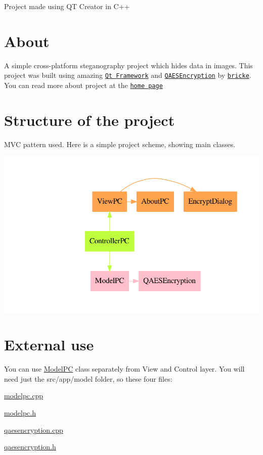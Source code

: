 Project made using QT Creator in C++\hypertarget{index_about}{}\section{About}\label{index_about}
A simple cross-\/platform steganography project which hides data in images. This project was built using amazing \href{https://qt.io}{\tt Qt Framework} and \href{https://github.com/bricke/Qt-AES}{\tt Q\+A\+E\+S\+Encryption} by \href{https://github.com/bricke}{\tt bricke}. You can read more about project at the \href{waleko.github.io/PictureCrypt}{\tt home page}\hypertarget{index_structure}{}\section{Structure of the project}\label{index_structure}
M\+VC pattern used. Here is a simple project scheme, showing main classes. 
\begin{DoxyImageNoCaption}
  \mbox{\includegraphics[width=\textwidth,height=\textheight/2,keepaspectratio=true]{dot_structure}}
\end{DoxyImageNoCaption}
\hypertarget{index_ext-use}{}\section{External use}\label{index_ext-use}
You can use \hyperlink{class_model_p_c}{Model\+PC} class separately from View and Control layer. You will need just the src/app/model folder, so these four files\+:


\begin{DoxyItemize}
\item \hyperlink{modelpc_8cpp}{modelpc.\+cpp} 
\item \hyperlink{modelpc_8h}{modelpc.\+h} 
\item \hyperlink{qaesencryption_8cpp}{qaesencryption.\+cpp} 
\item \hyperlink{qaesencryption_8h}{qaesencryption.\+h} 
\end{DoxyItemize}

